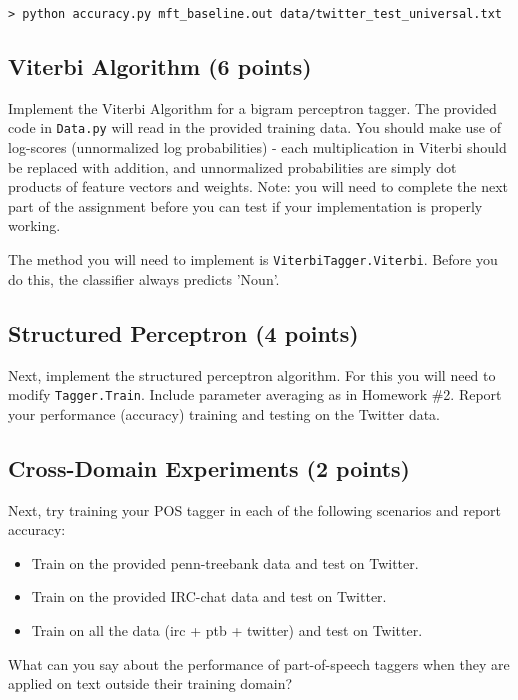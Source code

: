 \documentclass[12pt, letterpaper]{article}
\begin{document}
\begin{verbatim}
> python accuracy.py mft_baseline.out data/twitter_test_universal.txt
\end{verbatim}

\subsection*{Viterbi Algorithm (6 points)}
Implement the Viterbi Algorithm for a bigram perceptron tagger.  The provided code in {\tt Data.py} will read in the provided training data.
You should make use of log-scores (unnormalized log probabilities) - each multiplication in Viterbi should
be replaced with addition, and unnormalized probabilities are simply dot products of feature vectors and weights.
Note: you will need to complete the next part of the assignment before you can test if your implementation is properly working.

The method you will need to implement is {\tt ViterbiTagger.Viterbi}.  Before you do this, the classifier always predicts 'Noun'.

\subsection*{Structured Perceptron (4 points)}
Next, implement the structured perceptron algorithm.  For this you will need to modify {\tt Tagger.Train}.  Include
parameter averaging as in Homework \#2.
Report your performance (accuracy) training and testing on the Twitter data.

\subsection*{Cross-Domain Experiments (2 points)}
Next, try training your POS tagger in each of the following scenarios and report accuracy:

\begin{itemize}
  \item Train on the provided penn-treebank data and test on Twitter.
  \item Train on the provided IRC-chat data and test on Twitter.
  \item Train on all the data (irc + ptb + twitter) and test on Twitter.
\end{itemize}

What can you say about the performance of part-of-speech taggers when they are applied on text outside their
training domain?
\end{document}
